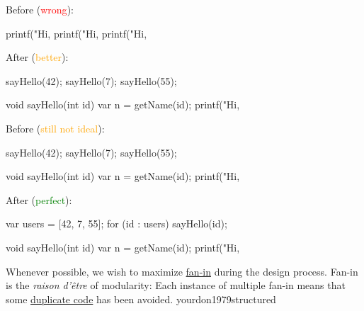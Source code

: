 \documentclass{article}
\begin{document}



\begin{multicols}{2}
Before (\textcolor{red}{wrong}):\par
{\small\begin{ffcode}
printf("Hi, %
printf("Hi, %
printf("Hi, %
\end{ffcode}
}
\par\columnbreak\par
After (\textcolor{orange}{better}):\par
{\small\begin{ffcode}
sayHello(42);
sayHello(7);
sayHello(55);

void sayHello(int id) {
  var n = getName(id);
  printf("Hi, %
}
\end{ffcode}
}
\end{multicols}
\plush{}

\begin{multicols}{2}
Before (\textcolor{orange}{still not ideal}):\par
{\small\begin{ffcode}
sayHello(42);
sayHello(7);
sayHello(55);

void sayHello(int id) {
  var n = getName(id);
  printf("Hi, %
}
\end{ffcode}
}
\par\columnbreak\par
After (\textcolor{green}{perfect}):\par
{\small\begin{ffcode}
var users = [42, 7, 55];
for (id : users) {
  sayHello(id);
}

void sayHello(int id) {
  var n = getName(id);
  printf("Hi, %
}
\end{ffcode}
}
\end{multicols}
\plush{}


  {Whenever possible, we wish to maximize \ul{fan-in} during the design process. Fan-in is the \textit{raison d'\^{e}tre} of modularity: Each instance of multiple fan-in means that some \ul{duplicate code} has been avoided.}
  {yourdon1979structured}
\end{document}
